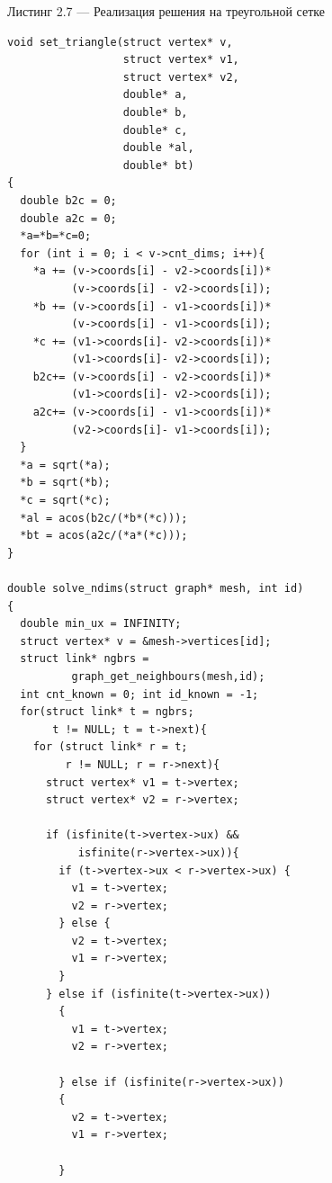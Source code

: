 \documentclass[a4paper,12pt]{article}
\begin{document}
\vspace{1em}
Листинг 2.7 --- Реализация решения на треугольной сетке
\normalsize
\begin{verbatim}
void set_triangle(struct vertex* v, 
                  struct vertex* v1, 
                  struct vertex* v2,
                  double* a, 
                  double* b, 
                  double* c,
                  double *al, 
                  double* bt)
{
  double b2c = 0;
  double a2c = 0;
  *a=*b=*c=0;
  for (int i = 0; i < v->cnt_dims; i++){
    *a += (v->coords[i] - v2->coords[i])*
          (v->coords[i] - v2->coords[i]);
    *b += (v->coords[i] - v1->coords[i])*
          (v->coords[i] - v1->coords[i]);
    *c += (v1->coords[i]- v2->coords[i])*
          (v1->coords[i]- v2->coords[i]);
    b2c+= (v->coords[i] - v2->coords[i])*
          (v1->coords[i]- v2->coords[i]);
    a2c+= (v->coords[i] - v1->coords[i])*
          (v2->coords[i]- v1->coords[i]);
  }
  *a = sqrt(*a);
  *b = sqrt(*b);
  *c = sqrt(*c);
  *al = acos(b2c/(*b*(*c)));
  *bt = acos(a2c/(*a*(*c)));
}

double solve_ndims(struct graph* mesh, int id)
{
  double min_ux = INFINITY;
  struct vertex* v = &mesh->vertices[id];
  struct link* ngbrs = 
          graph_get_neighbours(mesh,id);
  int cnt_known = 0; int id_known = -1;
  for(struct link* t = ngbrs; 
       t != NULL; t = t->next){
    for (struct link* r = t; 
         r != NULL; r = r->next){
      struct vertex* v1 = t->vertex;
      struct vertex* v2 = r->vertex;

      if (isfinite(t->vertex->ux) &&
           isfinite(r->vertex->ux)){
        if (t->vertex->ux < r->vertex->ux) {
          v1 = t->vertex;
          v2 = r->vertex;
        } else {
          v2 = t->vertex;
          v1 = r->vertex;
        }
      } else if (isfinite(t->vertex->ux))
        {
          v1 = t->vertex;
          v2 = r->vertex;

        } else if (isfinite(r->vertex->ux))
        {
          v2 = t->vertex;
          v1 = r->vertex;

        }


\end{verbatim}
\end{document}
